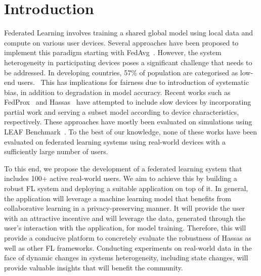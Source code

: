 \section{Introduction}
    Federated Learning involves training a shared global model using local data and compute on various user devices.
    Several approaches have been proposed to implement this paradigm starting with FedAvg~\cite{DBLP:journals/corr/McMahanMRA16}.
    However, the system heterogeneity in participating devices poses a significant challenge that needs to be addressed. In developing countries, 57\% of population are categorised as low-end users.~\cite{10.1145/3446382.3448652}
    This has implications for fairness due to introduction of systematic bias, in addition to degradation in model accuracy.
    Recent works such as FedProx~\cite{DBLP:journals/corr/abs-1812-06127} and Hassas~\cite{DBLP:journals/corr/abs-2110-14205} have attempted to include slow devices by incorporating partial work and serving a subset model according to device characteristics, respectively. 
    These approaches have mostly been evaluated on simulations using LEAF Benchmark~\cite{DBLP:journals/corr/abs-1812-01097}.
    To the best of our knowledge, none of these works have been evaluated on federated learning systems using real-world devices with a sufficiently large number of users. \newline

    To this end, we propose the development of a federated learning system that includes 100+ active real-world users. We aim to achieve this by building a robust FL system and deploying a suitable application on top of it. In general, the application will leverage a machine learning model that benefits from collaborative learning in a privacy-preserving manner. It will provide the user with an attractive incentive and will leverage the data, generated through the user's interaction with the application, for model training. Therefore, this will provide a conducive platform to concretely evaluate the robustness of Hassas as well as other FL frameworks. Conducting experiments on real-world data in the face of dynamic changes in systems heterogeneity, including state changes, will provide valuable insights that will benefit the community.